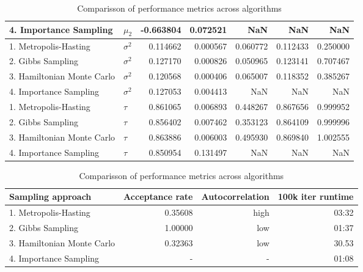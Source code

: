 \documentclass{article}
\begin{document}
\begin{table}[H]
\begin{center}
\begin{tabular}{llrrrrr}
          4. Importance Sampling &   $\mu_2$ & -0.663804 & 0.072521 &       NaN &       NaN &       NaN \\
\midrule
           1. Metropolis-Hasting &    $\sigma^2$ &  0.114662 & 0.000567 &  0.060772 &  0.112433 &  0.250000 \\
               2. Gibbs Sampling &    $\sigma^2$ &  0.127170 & 0.000826 &  0.050965 &  0.123141 &  0.707467 \\
      3. Hamiltonian Monte Carlo &    $\sigma^2$ &  0.120568 & 0.000406 &  0.065007 &  0.118352 &  0.385267 \\
          4. Importance Sampling &    $\sigma^2$ &  0.127053 & 0.004413 &       NaN &       NaN &       NaN \\
\midrule
           1. Metropolis-Hasting &   $\tau$ &  0.861065 & 0.006893 &  0.448267 &  0.867656 &  0.999952 \\
               2. Gibbs Sampling &   $\tau$ &  0.856402 & 0.007462 &  0.353123 &  0.864109 &  0.999996 \\
      3. Hamiltonian Monte Carlo &   $\tau$ &  0.863886 & 0.006003 &  0.495930 &  0.869840 &  1.002555 \\
          4. Importance Sampling &   $\tau$ &  0.850954 & 0.131497 &       NaN &       NaN &       NaN \\
      \bottomrule
      \end{tabular}
\end{center}
  \caption{\label{tab:c_theta} Comparisson of performance metrics across algorithms}
\end{table}


\begin{table}[H]
  \begin{center}
\begin{tabular}{lrrr}
  \textbf{Sampling approach} &  \textbf{Acceptance rate} & \textbf{Autocorrelation} &  \textbf{100k iter runtime} \\
  \midrule
       1. Metropolis-Hasting &  0.35608 &  high & 03:32 \\
           2. Gibbs Sampling &  1.00000 &   low & 01:37 \\
  3. Hamiltonian Monte Carlo &  0.32363 &   low & 30.53 \\
      4. Importance Sampling &      - &  - & 01:08 \\
  \bottomrule
  \end{tabular}
\end{center}
  \caption{\label{tab:c_overall} Comparisson of performance metrics across algorithms}
\end{table}
\end{document}
